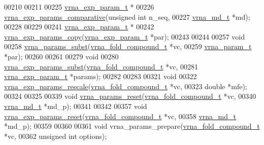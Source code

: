 \begin{DoxyCode}
00210 
00211 
00225 \hyperlink{group__energy__parameters_structvrna__exp__param__s}{vrna\_exp\_param\_t} *
00226 \hyperlink{group__energy__parameters_gaf78c09e685e6eef4100b1a41d4042550}{vrna\_exp\_params\_comparative}(\textcolor{keywordtype}{unsigned} \textcolor{keywordtype}{int}  n\_seq,
00227                             \hyperlink{group__model__details_structvrna__md__s}{vrna\_md\_t}     *md);
00228 
00229 
00241 \hyperlink{group__energy__parameters_structvrna__exp__param__s}{vrna\_exp\_param\_t} *
00242 \hyperlink{group__energy__parameters_ga70bc46be7cfa5434a71efe241c4f0609}{vrna\_exp\_params\_copy}(\hyperlink{group__energy__parameters_structvrna__exp__param__s}{vrna\_exp\_param\_t} *par);
00243 
00244 
00257 \textcolor{keywordtype}{void}
00258 \hyperlink{group__energy__parameters_ga5d1909208f7ea3baa98b75afaa1f62ca}{vrna\_params\_subst}(\hyperlink{group__fold__compound_structvrna__fc__s}{vrna\_fold\_compound\_t}  *vc,
00259                   \hyperlink{group__energy__parameters_structvrna__param__s}{vrna\_param\_t}          *par);
00260 
00261 
00279 \textcolor{keywordtype}{void}
00280 \hyperlink{group__energy__parameters_ga8e7ac4fab3b0cc03afbc134eaafb3525}{vrna\_exp\_params\_subst}(\hyperlink{group__fold__compound_structvrna__fc__s}{vrna\_fold\_compound\_t}  *vc,
00281                       \hyperlink{group__energy__parameters_structvrna__exp__param__s}{vrna\_exp\_param\_t}      *params);
00282 
00283 
00321 \textcolor{keywordtype}{void}
00322 \hyperlink{group__energy__parameters_gad607bc3a5b5da16400e2ca4ea5560233}{vrna\_exp\_params\_rescale}(\hyperlink{group__fold__compound_structvrna__fc__s}{vrna\_fold\_compound\_t}  *vc,
00323                         \textcolor{keywordtype}{double}                *mfe);
00324 
00325 
00339 \textcolor{keywordtype}{void} \hyperlink{group__energy__parameters_gac40dc82e48a72a97cfc58b9da08a7792}{vrna\_params\_reset}(\hyperlink{group__fold__compound_structvrna__fc__s}{vrna\_fold\_compound\_t} *vc,
00340                        \hyperlink{group__model__details_structvrna__md__s}{vrna\_md\_t}            *md\_p);
00341 
00342 
00357 \textcolor{keywordtype}{void} \hyperlink{group__energy__parameters_gaa5409218068be84d7b50c78fbdaa85a9}{vrna\_exp\_params\_reset}(\hyperlink{group__fold__compound_structvrna__fc__s}{vrna\_fold\_compound\_t} *vc,
00358                            \hyperlink{group__model__details_structvrna__md__s}{vrna\_md\_t}            *md\_p);
00359 
00360 
00361 \textcolor{keywordtype}{void} vrna\_params\_prepare(\hyperlink{group__fold__compound_structvrna__fc__s}{vrna\_fold\_compound\_t} *vc,
00362                          \textcolor{keywordtype}{unsigned} \textcolor{keywordtype}{int}         options);

\end{DoxyCode}
